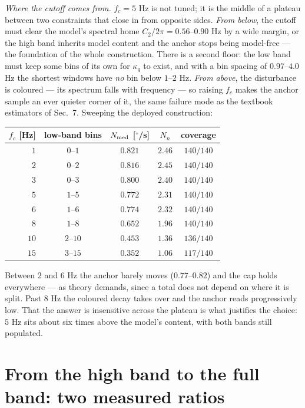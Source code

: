 \documentclass[10pt]{article}
\begin{document}
\emph{Where the cutoff comes from.} $f_c = 5$ Hz is not tuned; it is
the middle of a plateau between two constraints that close in from
opposite sides. \emph{From below}, the cutoff must clear the model's
spectral home $C_2/2\pi = 0.56$--$0.90$ Hz by a wide margin, or the
high band inherits model content and the anchor stops being
model-free --- the foundation of the whole construction. There is a
second floor: the low band must keep some bins of its own for
$\kappa_q$ to exist, and with a bin spacing of $0.97$--$4.0$ Hz the
shortest windows have \emph{no} bin below $1$--$2$ Hz.
\emph{From above}, the disturbance is coloured --- its spectrum falls
with frequency --- so raising $f_c$ makes the anchor sample an ever
quieter corner of it, the same failure mode as the textbook
estimators of Sec.~7. Sweeping the deployed construction:
\begin{center}\small
\begin{tabular}{@{}rcccc@{}}
\toprule
$f_c$ [Hz] & low-band bins & $N_{\rm med}$ [$^\circ$/s] & $N_n$ &
coverage\\
\midrule
$1$  & $0$--$1$  & $0.821$ & $2.46$ & $140/140$\\
$2$  & $0$--$2$  & $0.816$ & $2.45$ & $140/140$\\
$3$  & $0$--$3$  & $0.800$ & $2.40$ & $140/140$\\
$5$  & $1$--$5$  & $0.772$ & $2.31$ & $140/140$\\
$6$  & $1$--$6$  & $0.774$ & $2.32$ & $140/140$\\
$8$  & $1$--$8$  & $0.652$ & $1.96$ & $140/140$\\
$10$ & $2$--$10$ & $0.453$ & $1.36$ & $136/140$\\
$15$ & $3$--$15$ & $0.352$ & $1.06$ & $117/140$\\
\bottomrule
\end{tabular}
\end{center}
Between $2$ and $6$ Hz the anchor barely moves ($0.77$--$0.82$) and
the cap holds everywhere --- as theory demands, since a total does
not depend on where it is split. Past $8$ Hz the coloured decay takes
over and the anchor reads progressively low. That the answer is
insensitive across the plateau is what justifies the choice: $5$ Hz
sits about six times above the model's content, with both bands still
populated.

\section{From the high band to the full band: two measured ratios}
\end{document}

